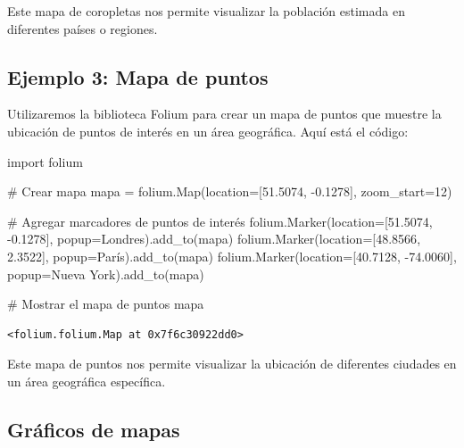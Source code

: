 \documentclass[
  a4paper,
]{article}
\newenvironment{Shaded}{}{}
\newcommand{\CommentTok}[1]{\textcolor[rgb]{0.42,0.45,0.49}{#1}}
\newcommand{\DecValTok}[1]{\textcolor[rgb]{0.00,0.36,0.77}{#1}}
\newcommand{\FloatTok}[1]{\textcolor[rgb]{0.00,0.36,0.77}{#1}}
\newcommand{\ImportTok}[1]{\textcolor[rgb]{0.01,0.18,0.38}{#1}}
\newcommand{\NormalTok}[1]{\textcolor[rgb]{0.14,0.16,0.18}{#1}}
\newcommand{\OperatorTok}[1]{\textcolor[rgb]{0.14,0.16,0.18}{#1}}
\newcommand{\StringTok}[1]{\textcolor[rgb]{0.01,0.18,0.38}{#1}}
\begin{document}
Este mapa de coropletas nos permite visualizar la población estimada en
diferentes países o regiones.

\hypertarget{ejemplo-3-mapa-de-puntos}{%
\subsection{Ejemplo 3: Mapa de puntos}\label{ejemplo-3-mapa-de-puntos}}

Utilizaremos la biblioteca Folium para crear un mapa de puntos que
muestre la ubicación de puntos de interés en un área geográfica. Aquí
está el código:

\begin{Shaded}
\begin{Highlighting}[]
\ImportTok{import}\NormalTok{ folium}

\CommentTok{\# Crear mapa}
\NormalTok{mapa }\OperatorTok{=}\NormalTok{ folium.Map(location}\OperatorTok{=}\NormalTok{[}\FloatTok{51.5074}\NormalTok{, }\OperatorTok{{-}}\FloatTok{0.1278}\NormalTok{], zoom\_start}\OperatorTok{=}\DecValTok{12}\NormalTok{)}

\CommentTok{\# Agregar marcadores de puntos de interés}
\NormalTok{folium.Marker(location}\OperatorTok{=}\NormalTok{[}\FloatTok{51.5074}\NormalTok{, }\OperatorTok{{-}}\FloatTok{0.1278}\NormalTok{], popup}\OperatorTok{=}\StringTok{\textquotesingle{}Londres\textquotesingle{}}\NormalTok{).add\_to(mapa)}
\NormalTok{folium.Marker(location}\OperatorTok{=}\NormalTok{[}\FloatTok{48.8566}\NormalTok{, }\FloatTok{2.3522}\NormalTok{], popup}\OperatorTok{=}\StringTok{\textquotesingle{}París\textquotesingle{}}\NormalTok{).add\_to(mapa)}
\NormalTok{folium.Marker(location}\OperatorTok{=}\NormalTok{[}\FloatTok{40.7128}\NormalTok{, }\OperatorTok{{-}}\FloatTok{74.0060}\NormalTok{], popup}\OperatorTok{=}\StringTok{\textquotesingle{}Nueva York\textquotesingle{}}\NormalTok{).add\_to(mapa)}

\CommentTok{\# Mostrar el mapa de puntos}
\NormalTok{mapa}
\end{Highlighting}
\end{Shaded}

\begin{verbatim}
<folium.folium.Map at 0x7f6c30922dd0>
\end{verbatim}

Este mapa de puntos nos permite visualizar la ubicación de diferentes
ciudades en un área geográfica específica.

\hypertarget{gruxe1ficos-de-mapas}{%
\subsection{Gráficos de mapas}\label{gruxe1ficos-de-mapas}}
\end{document}
